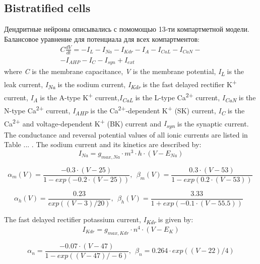 \documentclass[a4paper,12pt]{article}
\begin{document}
\subsection{Bistratified cells}
Дендритные нейроны описывались с помомощью 13-ти компартметной модели. Балансовое уравнение для потенциала для всех компартментов:
\begin{eqnarray}
C\frac{dV}{dt}=-I_L-I_{Na}-I_{Kdr}-I_A-I_{CaL}-I_{CaN} - \nonumber \\ -I_{AHP}-I_C-I_{syn}+I_{ext}
\end{eqnarray}
where \textit{C} is the membrane capacitance, \textit{V} is the membrane potential, \textit{I\textsubscript{L}}
is the leak current, \textit{I\textsubscript{Na}} is the sodium current, \textit{I\textsubscript{Kdr}} is the fast delayed rectifier K\textsuperscript{+} current, \textit{I}\textit{\textsubscript{A}} is the A-type K\textsuperscript{+} current,\textit{I\textsubscript{CaL}}
is the L-type Ca\textsuperscript{2+} current, \textit{I}\textit{\textsubscript{CaN}} is the N-type
Ca\textsuperscript{2+} current, \textit{I}\textit{\textsubscript{AHP}} is the Ca\textsuperscript{2+}-dependent
K\textsuperscript{+} (SK) current, \textit{I}\textit{\textsubscript{C}} is the Ca\textsuperscript{2+} and
voltage-dependent K\textsuperscript{+} (BK) current and \textit{I}\textit{\textsubscript{syn}} is the synaptic current.
The conductance and reversal potential values of all ionic currents are listed in Table ... .
The sodium current and its kinetics are described by:
\begin{equation}
I_{Na}=g_{max, Na} \cdot m^3 \cdot h \cdot (V-E_{Na})
\end{equation}

\begin{equation}
\alpha_m(V)=\frac{-0.3\cdot(V-25)}{1-exp(-0.2\cdot(V-25))}, \ \  \beta_m(V)=\frac{0.3\cdot(V-53)}{1-exp(0.2\cdot(V-53))} \ 
\end{equation}

\begin{equation}
\alpha_h(V)=\frac{0.23}{exp((V-3)/20)}, \ \  \beta_h(V)=\frac{3.33}{1+exp(-0.1\cdot(V-55.5))}\ \ \ 
\end{equation}

The fast delayed rectifier potassium current, \textit{I\textsubscript{Kdr}} is given by:
\begin{equation}
I_{Kdr} = g_{max, Kdr} \cdot n^4 \cdot (V-E_K)
\end{equation}

\begin{equation}
\alpha_{n}=\frac{-0.07\cdot(V-47)}{1-exp((V-47)/-6)}, \ \  \beta_{n}=0.264\cdot exp((V-22)/4)
\end{equation}
\end{document}
